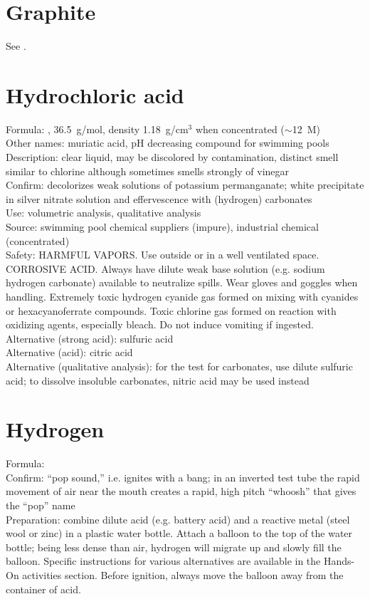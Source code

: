 \section{Graphite}
\label{sec:}
See .

\section{Hydrochloric acid}
\label{sec:hydroacid}
Formula: , 
36.5~g/mol, 
density 1.18~g/cm$^{3}$ when concentrated ($\sim$12~M)\\
Other names: muriatic acid, 
pH decreasing compound for swimming pools\\
Description: clear liquid, 
may be discolored by contamination, 
distinct smell similar to chlorine 
although sometimes smells strongly of vinegar\\
Confirm: decolorizes weak solutions of potassium permanganate; 
white precipitate in silver nitrate solution 
and effervescence with (hydrogen) carbonates\\
Use: volumetric analysis, 
qualitative analysis\\
Source: swimming pool chemical suppliers (impure), industrial chemical (concentrated)\\ 
Safety: HARMFUL VAPORS. 
Use outside or in a well ventilated space. 
CORROSIVE ACID. 
Always have dilute weak base solution (e.g. 
sodium hydrogen carbonate) available to neutralize spills. 
Wear gloves and goggles when handling. 
Extremely toxic hydrogen cyanide gas formed 
on mixing with cyanides or hexacyanoferrate compounds. 
Toxic chlorine gas formed on reaction with oxidizing agents, 
especially bleach. 
Do not induce vomiting if ingested.\\
Alternative (strong acid): sulfuric acid\\
Alternative (acid): citric acid\\
Alternative (qualitative analysis): for the test for carbonates, 
use dilute sulfuric acid; 
to dissolve insoluble carbonates, 
nitric acid may be used instead

\section{Hydrogen}
\label{sec:}
Formula: \\
Confirm: ``pop sound,'' i.e. 
ignites with a bang; 
in an inverted test tube the rapid movement of air 
near the mouth creates a rapid, 
high pitch ``whoosh'' that gives the ``pop'' name\\
Preparation: combine dilute acid (e.g. 
battery acid) and a reactive metal (steel wool or zinc) 
in a plastic water bottle. 
Attach a balloon to the top of the water bottle; 
being less dense than air, 
hydrogen will migrate up and slowly fill the balloon. 
Specific instructions for various alternatives are available 
in the Hands-On activities section. 
Before ignition, 
always move the balloon away from the container of acid.

